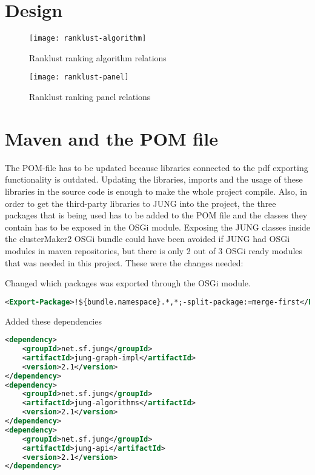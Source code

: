 \section{Design}
\begin{figure}[H]
    \caption{Ranklust ranking algorithm relations}
    \label{fig:rank-alg}
    \texttt{[image: ranklust-algorithm]}
\end{figure}
\begin{figure}[H]
    \caption{Ranklust ranking panel relations}
    \label{fig:rank-panel}
    \texttt{[image: ranklust-panel]}
\end{figure}

\section{Maven and the POM file}
The POM-file has to be updated because libraries connected to the pdf exporting
functionality is outdated. Updating the libraries, imports and the usage of
these libraries in the source code is enough to make the whole project compile.
Also, in order to get the third-party libraries to JUNG\cite{jung} into the
project, the three packages that is being used has to be added to the POM file
and the classes they contain has to be exposed in the OSGi
module\cite{osgi-felix}. Exposing the JUNG classes inside the clusterMaker2 OSGi
bundle could have been avoided if JUNG had OSGi modules in maven repositories,
but there is only 2 out of 3 OSGi ready modules that was needed in this project.
These were the changes needed:

Changed which packages was exported through the OSGi module.

\begin{lstlisting}[language=XML, caption={POM-file OSGi changes}]
<Export-Package>!${bundle.namespace}.*,*;-split-package:=merge-first</Export-Package>
\end{lstlisting}

Added these dependencies

\begin{lstlisting}[language=XML, caption={POM-file JUNG changes}]
<dependency>
    <groupId>net.sf.jung</groupId>
    <artifactId>jung-graph-impl</artifactId>
    <version>2.1</version>
</dependency>
<dependency>
    <groupId>net.sf.jung</groupId>
    <artifactId>jung-algorithms</artifactId>
    <version>2.1</version>
</dependency>
<dependency>
    <groupId>net.sf.jung</groupId>
    <artifactId>jung-api</artifactId>
    <version>2.1</version>
</dependency>
\end{lstlisting}

